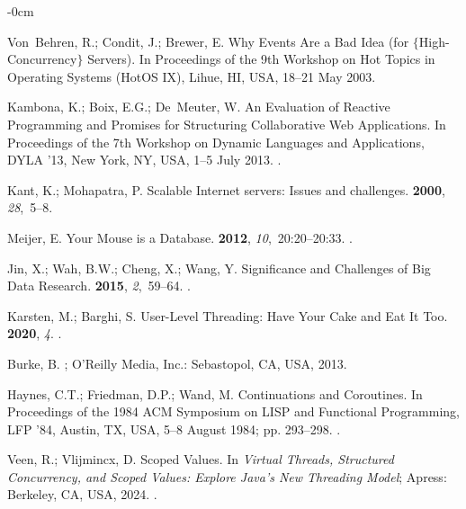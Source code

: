 \documentclass[software,article,accept,pdftex,moreauthors]{Definitions/mdpi}
\begin{document}
\begin{adjustwidth}{-\extralength}{0cm}
\begin{thebibliography}{999}
Von~Behren, R.; Condit, J.; Brewer, E.
\newblock Why Events Are a Bad Idea (for $\{$High-Concurrency$\}$ Servers).
\newblock In Proceedings of the 9th Workshop on Hot Topics in Operating Systems
  (HotOS IX), Lihue, HI, USA, 18–21 May 2003.

Kambona, K.; Boix, E.G.; De~Meuter, W.
\newblock An Evaluation of Reactive Programming and Promises for Structuring
  Collaborative Web Applications.
\newblock In Proceedings of the 7th Workshop on Dynamic
  Languages and Applications, DYLA '13, New York, NY, USA, 1–5 July 2013.
.

Kant, K.; Mohapatra, P.
\newblock Scalable Internet servers: Issues and challenges.
 {\bf 2000}, {\em
  28},~5--8.

Meijer, E.
\newblock Your Mouse is a Database.
 {\bf 2012}, {\em 10},~20:20--20:33.
.

Jin, X.; Wah, B.W.; Cheng, X.; Wang, Y.
\newblock Significance and Challenges of Big Data Research.
 {\bf 2015}, {\em 2},~59--64.
.

Karsten, M.; Barghi, S.
\newblock User-Level Threading: Have Your Cake and Eat It Too.
 {\bf 2020}, {\em 4}.
.

Burke, B.
; O'Reilly Media, Inc.: Sebastopol, CA, USA, 2013.

Haynes, C.T.; Friedman, D.P.; Wand, M.
\newblock Continuations and Coroutines.
\newblock In Proceedings of the 1984 ACM Symposium on LISP
  and Functional Programming, LFP '84, Austin, TX, USA, 5--8 August 1984; pp. 293–298.
.

Veen, R.; Vlijmincx, D. Scoped Values.
\newblock In {\em Virtual Threads, Structured Concurrency, and Scoped Values:
  Explore Java's New Threading Model}; Apress: Berkeley, CA, USA, 2024.
.


\end{thebibliography}
\end{adjustwidth}
\end{document}
